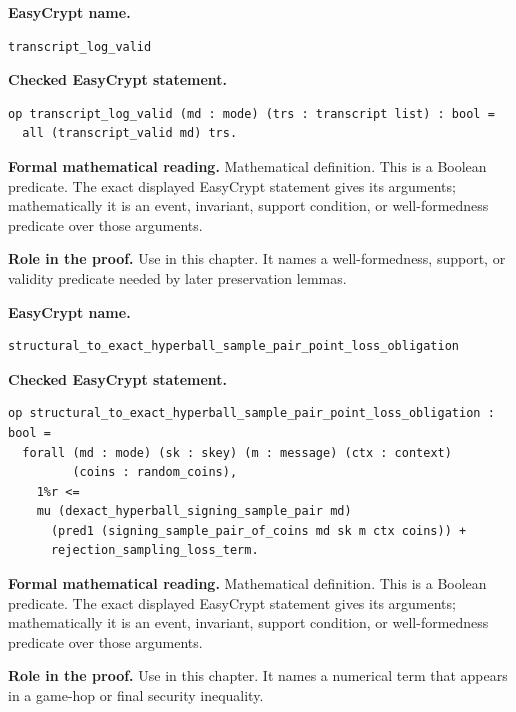 \begin{formaldefinition}
\noindent\textbf{EasyCrypt name.}
\begin{lstlisting}[language=EasyCrypt,basicstyle=\ttfamily\scriptsize]
transcript_log_valid
\end{lstlisting}
\noindent\textbf{Checked EasyCrypt statement.}
\begin{lstlisting}[language=EasyCrypt,basicstyle=\ttfamily\scriptsize]
op transcript_log_valid (md : mode) (trs : transcript list) : bool =
  all (transcript_valid md) trs.
\end{lstlisting}
\noindent\textbf{Formal mathematical reading.}
Mathematical definition. This is a Boolean predicate.  The exact displayed EasyCrypt statement gives its arguments; mathematically it is an event, invariant, support condition, or well-formedness predicate over those arguments.

\noindent\textbf{Role in the proof.}
Use in this chapter. It names a well-formedness, support, or validity predicate needed by later preservation lemmas.

\end{formaldefinition}

\begin{formaldefinition}
\noindent\textbf{EasyCrypt name.}
\begin{lstlisting}[language=EasyCrypt,basicstyle=\ttfamily\scriptsize]
structural_to_exact_hyperball_sample_pair_point_loss_obligation
\end{lstlisting}
\noindent\textbf{Checked EasyCrypt statement.}
\begin{lstlisting}[language=EasyCrypt,basicstyle=\ttfamily\scriptsize]
op structural_to_exact_hyperball_sample_pair_point_loss_obligation : bool =
  forall (md : mode) (sk : skey) (m : message) (ctx : context)
         (coins : random_coins),
    1%r <=
    mu (dexact_hyperball_signing_sample_pair md)
      (pred1 (signing_sample_pair_of_coins md sk m ctx coins)) +
      rejection_sampling_loss_term.
\end{lstlisting}
\noindent\textbf{Formal mathematical reading.}
Mathematical definition. This is a Boolean predicate.  The exact displayed EasyCrypt statement gives its arguments; mathematically it is an event, invariant, support condition, or well-formedness predicate over those arguments.

\noindent\textbf{Role in the proof.}
Use in this chapter. It names a numerical term that appears in a game-hop or final security inequality.

\end{formaldefinition}

